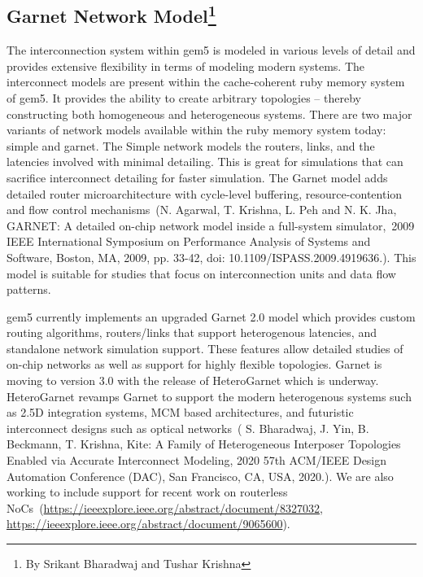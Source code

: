 \subsection[Garnet Network Model]{Garnet Network Model\footnote{By Srikant Bharadwaj and Tushar Krishna}}

The interconnection system within gem5 is modeled in various levels of detail and provides extensive
flexibility in terms of modeling modern systems.
The interconnect models are present within the cache-coherent ruby memory system of gem5.
It provides the ability to create arbitrary topologies – thereby constructing both homogeneous and heterogeneous systems.
There are two major variants of network models available within the ruby memory system today: simple and garnet.
The Simple network models the routers, links, and the latencies involved with minimal detailing.
This is great for simulations that can sacrifice interconnect detailing for faster simulation.
The Garnet model adds detailed router microarchitecture with cycle-level buffering, resource-contention and flow control mechanisms~\cite{}(N. Agarwal, T. Krishna, L. Peh and N. K. Jha, GARNET: A detailed on-chip network model inside a full-system simulator, 2009 IEEE International Symposium on Performance Analysis of Systems and Software, Boston, MA, 2009, pp. 33-42, doi: 10.1109/ISPASS.2009.4919636.).
This model is suitable for studies that focus on interconnection units and data flow patterns.

gem5 currently implements an upgraded Garnet 2.0 model which provides custom routing algorithms, routers/links that support heterogenous latencies, and standalone network simulation support.
These features allow detailed studies of on-chip networks as well as support for highly flexible topologies.
Garnet is moving to version 3.0 with the release of HeteroGarnet which is underway.
HeteroGarnet revamps Garnet to support the modern heterogenous systems such as 2.5D integration systems, MCM based architectures, and futuristic interconnect designs such as optical networks~\cite{}( S. Bharadwaj, J. Yin, B. Beckmann, T. Krishna, Kite: A Family of Heterogeneous Interposer Topologies Enabled via Accurate Interconnect Modeling, 2020 57th ACM/IEEE Design Automation Conference (DAC), San Francisco, CA, USA, 2020.).
We are also working to include support for recent work on routerless NoCs~\cite{}(\url{https://ieeexplore.ieee.org/abstract/document/8327032}, \url{https://ieeexplore.ieee.org/abstract/document/9065600}).
